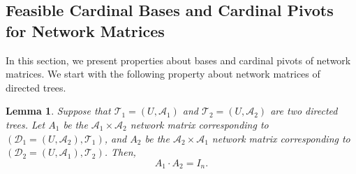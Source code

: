 \documentclass[11pt]{article}
\newtheorem{lemma}[theorem]{Lemma}
\begin{document}
\subsection{Feasible Cardinal Bases and Cardinal Pivots for Network Matrices}\label{sec:Pivot-NM}
In this section, we present properties about bases and cardinal pivots of network matrices. We start with the following property about network matrices of directed trees. 
\begin{lemma}\label{lem:Base-Inverse}
    Suppose that $\mathcal{T}_1=(U,\mathcal{A}_1)$ and $\mathcal{T}_2=(U,\mathcal{A}_2)$ are two directed trees. Let $A_1$ be the $\mathcal{A}_1\times\mathcal{A}_2$ network matrix corresponding to $(\mathcal{D}_1=(U,\mathcal{A}_2),\mathcal{T}_1)$, and $A_2$ be the $\mathcal{A}_2\times\mathcal{A}_1$ network matrix corresponding to $(\mathcal{D}_2=(U,\mathcal{A}_1),\mathcal{T}_2)$. Then,
    \begin{equation}\label{eq:Base-Inverse}
        A_1\cdot A_2=I_n.
    \end{equation}
\end{lemma}
\end{document}
